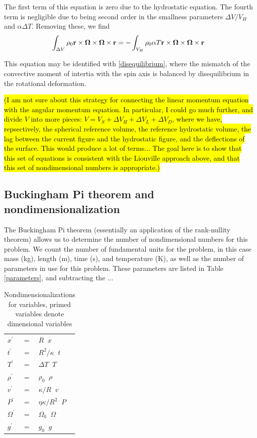 \documentclass[extra,mreferee]{gji}
\newif\ifdetail
\begin{document}
The first term of this equation is zero due to the hydrostatic equation.  
The fourth term is negligible due to being second order in the smallness parameters $\Delta V/V_H$ and $\alpha \Delta T$.
Removing these, we find
\begin{equation}
\begin{aligned}
\int_{\Delta V} \rho_0 {\bf r \times \mitbf{\Omega} \times \mitbf{\Omega} \times {\bf r }} = 
-\int_{V_H} \rho_0 \alpha T {\bf r \times \mitbf{\Omega} \times \mitbf{\Omega} \times {\bf r }}
\end{aligned}
\end{equation}

This equation may be identified with \ref{disequilibrium}, where the mismatch of the convective moment of intertia with the spin axis is balanced by disequilibrium in the rotational deformation.

\hl{(I am not sure about this strategy for connecting the linear momentum equation with the angular momentum equation.  In particular, I could go much further, and divide $V$ into more pieces: $V = V_S + \Delta V_H + \Delta V_L + \Delta V_D$, where we have, repsectively, the spherical reference volume, the reference hydrostatic volume, the lag between the current figure and the hydrostatic figure, and the deflections of the surface.  This would produce a lot of terms...  The goal here is to show that this set of equations is consistent with the Liouville approach above, and that this set of nondimensional numbers is appropriate.)}

\ifdetail
\subsection{Buckingham Pi theorem and nondimensionalization}
The Buckingham Pi theorem (essentially an application of the rank-nullity theorem) allows us to determine the number of nondimensional numbers for this problem.
We count the number of fundamental units for the problem, in this case mass (kg), length (m), time (s), and temperature (K), as well as the number of parameters in use for this problem.  
These parameters are listed in Table \ref{parameters}, and subtracting the ...

\begin{table}
\centering
\caption{Nondimensionalizations for variables, primed variables denote dimensional variables}
\label{nondim_convert}
\begin{tabular}{@{}lll}
$x^\prime$ &=& $R \;\; x$ \\
$t^\prime$ &=& $R^2/\kappa \;\; t$ \\
$T^\prime$ &=& $\Delta T \;\; T$ \\
$\rho^\prime$ &=& $\rho_0 \;\; \rho$\\
$v^\prime$ &=& $\kappa/R \;\; v$ \\
$P^\prime$ &=& $\eta \kappa/R^2 \;\; P$ \\
$\Omega^\prime$ &=& $\Omega_0 \;\; \Omega$ \\
$g^\prime$ &=& $g_0 \;\; g$
\end{tabular}
\end{table}
\end{document}
